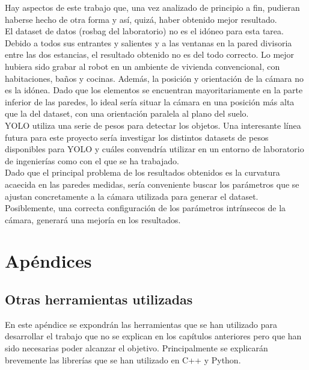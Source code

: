 Hay aspectos de este trabajo que, una vez analizado de principio a fin, pudieran haberse hecho de otra forma y así, quizá, haber obtenido mejor resultado.\\

El dataset de datos (rosbag del laboratorio) no es el idóneo para esta tarea. Debido a todos sus entrantes y salientes y a las ventanas en la pared divisoria entre las dos estancias, el resultado obtenido no es del todo correcto. Lo mejor hubiera sido grabar al robot en un ambiente de vivienda convencional, con habitaciones, baños y cocinas. Además, la posición y orientación de la cámara no es la idónea. Dado que los elementos se encuentran mayoritariamente en la parte inferior de las paredes, lo ideal sería situar la cámara en una posición más alta que la del dataset, con una orientación paralela al plano del suelo.\\

YOLO utiliza una serie de pesos para detectar los objetos. Una interesante línea futura para este proyecto sería investigar los distintos datasets de pesos disponibles para YOLO y cuáles convendría utilizar en un entorno de laboratorio de ingenierías como con el que se ha trabajado.\\

Dado que el principal problema de los resultados obtenidos es la curvatura acaecida en las paredes medidas, sería conveniente buscar los parámetros que se ajustan concretamente a la cámara utilizada para generar el dataset. Posiblemente, una correcta configuración de los parámetros intrínsecos de la cámara, generará una mejoría en los resultados.\\


\part{Apéndices}

\appendix

\chapter{Otras herramientas utilizadas}

En este apéndice se expondrán las herramientas que se han utilizado para desarrollar el trabajo que no se explican en los capítulos anteriores pero que han sido necesarias poder alcanzar el objetivo. Principalmente se explicarán brevemente las librerías que se han utilizado en C++ y Python.\\

